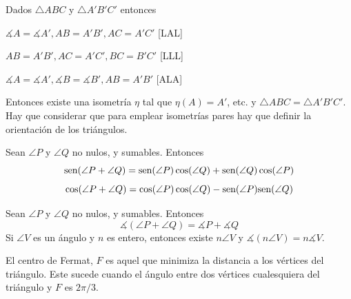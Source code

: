  Dados $\triangle ABC$ y $\triangle A'B'C'$ entonces
\begin{itemizex}
	\item $\measuredangle A =  \measuredangle A', AB = A'B', AC = A'C'$ [LAL]
	\item $AB = A'B', AC = A'C', BC = B'C'$ [LLL]
	\item $\measuredangle A = \measuredangle A', \measuredangle B = \measuredangle B', AB = A'B'$ [ALA]
\end{itemizex}
Entonces existe una isometría $\eta$ tal que $\eta(A) = A'$, etc. y $\triangle ABC = \triangle A'B'C'$. Hay que considerar que para emplear isometrías pares hay que definir la orientación de los triángulos.

 Sean $\angle P$ y $\angle Q$ no nulos, y sumables. Entonces
$$ \text{sen}(\angle P  + \angle Q) = \text{sen}(\angle P)\cos(\angle Q) + \text{sen}(\angle Q)\cos(\angle P) $$
$$ \cos(\angle P  + \angle Q) = \cos(\angle P)\cos(\angle Q) - \text{sen}(\angle P)\text{sen}(\angle Q)$$

 Sean  $\angle P$ y $\angle Q$ no nulos, y sumables. Entonces 
$$\measuredangle (\angle P  + \angle Q) = \measuredangle P + \measuredangle Q$$
 Si $\angle V$ es un ángulo y $n$ es entero, entonces existe $n\angle V$ y $\measuredangle (n \angle V) = n \measuredangle V$.

 El centro de Fermat, $F$ es aquel que minimiza la distancia a los vértices del triángulo. Este sucede cuando el ángulo entre dos vértices cualesquiera del triángulo y $F$ es $2\pi/3$.


